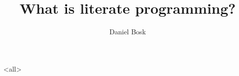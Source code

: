 \documentclass[9pt,ignoreframetext]{beamer}
\begin{document}
\title{%
  What is literate programming?
}
\author{%
  Daniel Bosk
}


\begin{frame}
  \maketitle
\end{frame}

\begin{abstract}
  
\end{abstract}

\clearpage

\begin{frame}
\end{frame}

\clearpage

\mode<all>

\mode*
\end{document}

